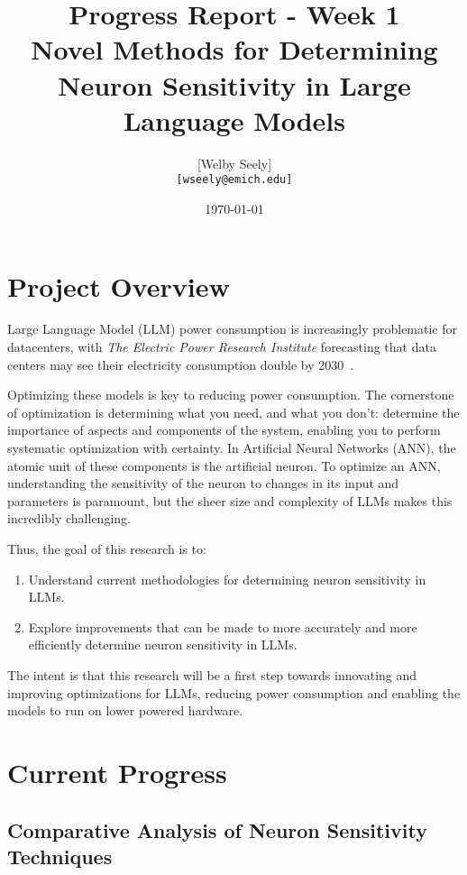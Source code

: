 \documentclass{article}
\title{Progress Report - Week 1 \\
\large Novel Methods for Determining Neuron Sensitivity in Large Language Models}
\author{
    [Welby Seely] \\
    \texttt{[wseely@emich.edu]}
}
\date{\today}
\begin{document}
    \maketitle

    \section*{Project Overview}
    Large Language Model (LLM) power consumption is increasingly problematic for datacenters, with \textit{The Electric Power
    Research Institute} forecasting that data centers may see their electricity consumption double by
    2030~\cite{kindig2024}.

    Optimizing these models is key to reducing power consumption.
    The cornerstone of optimization is determining what you need, and what you don't: determine the importance of
    aspects and components of the system, enabling you to perform systematic optimization with certainty.
    In Artificial Neural Networks (ANN), the atomic unit of these components is the artificial neuron.
    To optimize an ANN, understanding the sensitivity of the neuron to changes in its input and parameters is paramount,
    but the sheer size and complexity of LLMs makes this incredibly challenging.

    Thus, the goal of this research is to:
    \begin{enumerate}
        \item Understand current methodologies for determining neuron sensitivity in LLMs.
        \item Explore improvements that can be made to more accurately and more efficiently determine neuron sensitivity in
        LLMs.
    \end{enumerate}

    The intent is that this research will be a first step towards innovating and improving optimizations for LLMs,
    reducing power consumption and enabling the models to run on lower powered hardware.

    \section*{Current Progress}
    \subsection*{Comparative Analysis of Neuron Sensitivity Techniques}
\end{document}
